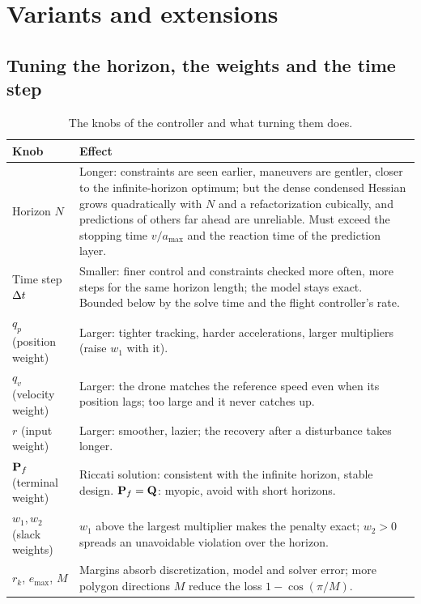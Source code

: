 \section{Variants and extensions}
\label{sec:ch21-variants}

\subsection{Tuning the horizon, the weights and the time step}
\label{sec:ch21-tuning}

\begin{table}[tb]
\centering\small
\caption{The knobs of the controller and what turning them does.}
\label{tab:ch21-tuning}
\begin{tabular}{@{}lL{10.4cm}@{}}
\toprule
Knob & Effect\\
\midrule
Horizon $N$ & Longer: constraints are seen earlier, maneuvers are gentler, closer to the infinite-horizon optimum; but the dense condensed Hessian grows quadratically with $N$ and a refactorization cubically, and predictions of others far ahead are unreliable. Must exceed the stopping time $v/a_{\max}$ and the reaction time of the prediction layer.\\
Time step $\Delta t$ & Smaller: finer control and constraints checked more often, more steps for the same horizon length; the model stays exact. Bounded below by the solve time and the flight controller's rate.\\
$q_p$ (position weight) & Larger: tighter tracking, harder accelerations, larger multipliers (raise $w_1$ with it).\\
$q_v$ (velocity weight) & Larger: the drone matches the reference speed even when its position lags; too large and it never catches up.\\
$r$ (input weight) & Larger: smoother, lazier; the recovery after a disturbance takes longer.\\
$\mathbf{P}_f$ (terminal weight) & Riccati solution: consistent with the infinite horizon, stable design. $\mathbf{P}_f=\mathbf{Q}$: myopic, avoid with short horizons.\\
$w_1,w_2$ (slack weights) & $w_1$ above the largest multiplier makes the penalty exact; $w_2>0$ spreads an unavoidable violation over the horizon.\\
$r_k$, $e_{\max}$, $M$ & Margins absorb discretization, model and solver error; more polygon directions $M$ reduce the loss $1-\cos(\pi/M)$.\\
\bottomrule
\end{tabular}
\end{table}

